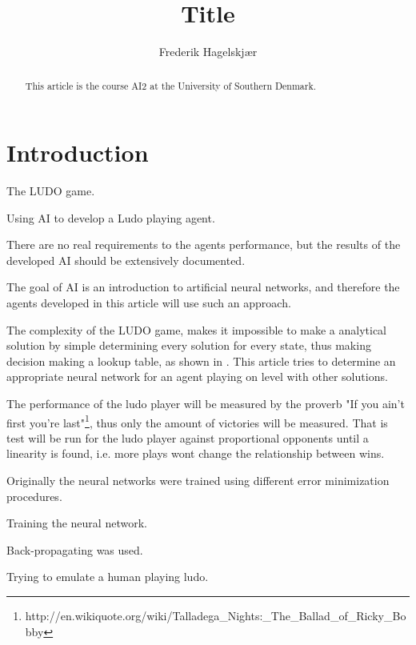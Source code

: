 \documentclass{llncs}
\begin{document}
\title{Title}
\author{Frederik Hagelskjær}
\maketitle

\begin{abstract}

This article is the course AI2 at the University of Southern Denmark. 

\end{abstract}

\section*{Introduction}

The LUDO game. 

Using AI to develop a Ludo playing agent. 

There are no real requirements to the agents performance, but the results of the developed AI should be extensively documented. 

The goal of AI is an introduction to artificial neural networks, and therefore the agents developed in this article will use such an approach.

The complexity of the LUDO game, makes it impossible to make a analytical solution by simple determining every solution for every state, thus making decision making a lookup table, as shown in \citep{6031999}. This article tries to determine an appropriate neural network for an agent playing on level with other solutions.

The performance of the ludo player will be measured by the proverb "If you ain't first you're last"\footnote{http://en.wikiquote.org/wiki/Talladega_Nights:_The_Ballad_of_Ricky_Bobby}, thus only the amount of victories will be measured. That is test will be run for the ludo player against proportional opponents until a linearity is found, i.e. more plays wont change the relationship between wins.

Originally the neural networks were trained using different error minimization procedures.

Training the neural network.

Back-propagating was used. 

Trying to emulate a human playing ludo.
\end{document}
